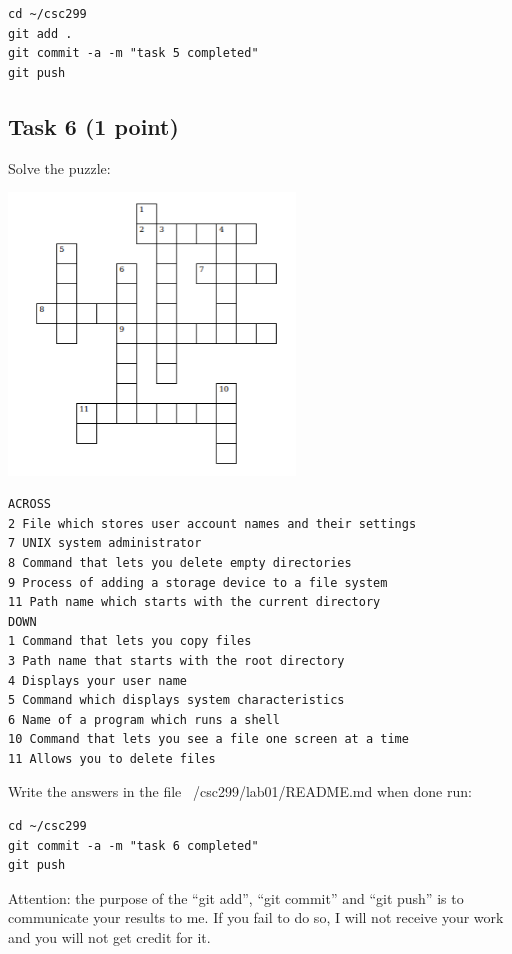 \documentclass[12pt]{article}
\begin{document}
\begin{verbatim}
cd ~/csc299
git add .
git commit -a -m "task 5 completed"
git push
\end{verbatim}

\subsection{Task 6 (1 point)}

Solve the puzzle:

\includegraphics[width=3in]{puzzle.png}

\begin{verbatim}
ACROSS
2 File which stores user account names and their settings
7 UNIX system administrator
8 Command that lets you delete empty directories
9 Process of adding a storage device to a file system
11 Path name which starts with the current directory
DOWN
1 Command that lets you copy files
3 Path name that starts with the root directory
4 Displays your user name
5 Command which displays system characteristics
6 Name of a program which runs a shell
10 Command that lets you see a file one screen at a time
11 Allows you to delete files
\end{verbatim}
Write the answers in the file ~/csc299/lab01/README.md when done run:

\begin{verbatim}
cd ~/csc299
git commit -a -m "task 6 completed"
git push
\end{verbatim}

Attention: the purpose of the ``git add'', ``git commit'' and ``git push'' is to communicate your results to me. If you fail to do so, I will not receive your work and you will not get credit for it.
\end{document}

